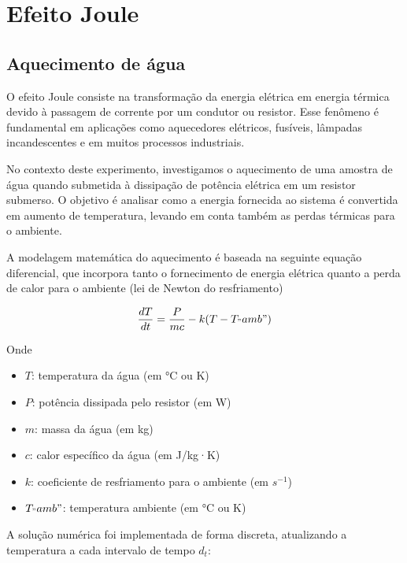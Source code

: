 \documentclass[conference]{IEEEtran}
\begin{document}
\section{Efeito Joule }

\subsection{Aquecimento de água}

O efeito Joule consiste na transformação da energia elétrica em energia térmica devido à passagem de corrente por um condutor ou resistor. Esse fenômeno é fundamental em aplicações como aquecedores elétricos, fusíveis, lâmpadas incandescentes e em muitos processos industriais.

No contexto deste experimento, investigamos o aquecimento de uma amostra de água quando submetida à dissipação de potência elétrica em um resistor submerso. O objetivo é analisar como a energia fornecida ao sistema é convertida em aumento de temperatura, levando em conta também as perdas térmicas para o ambiente.

A modelagem matemática do aquecimento é baseada na seguinte equação diferencial, que incorpora tanto o fornecimento de energia elétrica quanto a perda de calor para o ambiente (lei de Newton do resfriamento) %

\begin{equation}
    \frac{dT}{dt} = \frac{P}{mc} - k (T - T_"amb") %
\end{equation}

\noindent
Onde

\begin{itemize}
    \item$T$: temperatura da água (em °C ou K)
    \item $P$: potência dissipada pelo resistor (em W)
    \item $m$: massa da água (em kg)
    \item $c$: calor específico da água (em J/kg·K)
    \item $k$: coeficiente de resfriamento para o ambiente (em $s^{-1}$)
    \item $T_"amb"$: temperatura ambiente (em °C ou K)
\end{itemize}

A solução numérica foi implementada de forma discreta, atualizando a temperatura a cada intervalo de tempo $d_t$:
\end{document}
